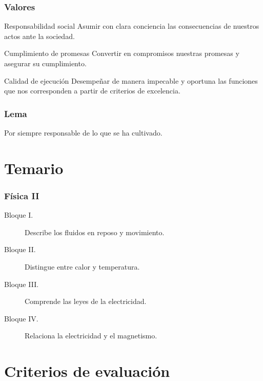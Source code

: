\documentclass[handout]{beamer}
\begin{document}
\begin{frame}
  \frametitle{Valores}
  
  \begin{block}{Responsabilidad social}
    Asumir con clara conciencia las consecuencias de nuestros actos ante la sociedad.
  \end{block}
  \begin{block}{Cumplimiento de promesas}
    Convertir en compromisos nuestras promesas y asegurar su cumplimiento.
  \end{block}
  \begin{block}{Calidad de ejecución}
    Desempeñar de manera impecable y oportuna las funciones que nos corresponden a partir
    de criterios de excelencia.
  \end{block}
  
\end{frame}

\begin{frame}
  \frametitle{Lema}
  \begin{center}
    \begin{block}
      {\Large Por siempre responsable de lo que se ha cultivado.}
    \end{block}
    
  \end{center}
\end{frame}

\section{Temario}

\begin{frame}
  \frametitle{Física II}
  \begin{block}{}
    \begin{description}
    \item[Bloque I.] Describe los fluidos en reposo y movimiento.
    \item[Bloque II.] Distingue entre calor y temperatura.
    \item[Bloque III.] Comprende las leyes de la electricidad.
    \item[Bloque IV.] Relaciona la electricidad y el magnetismo.
    \end{description}
  \end{block}
\end{frame}


\section{Criterios de evaluación}
\end{document}
